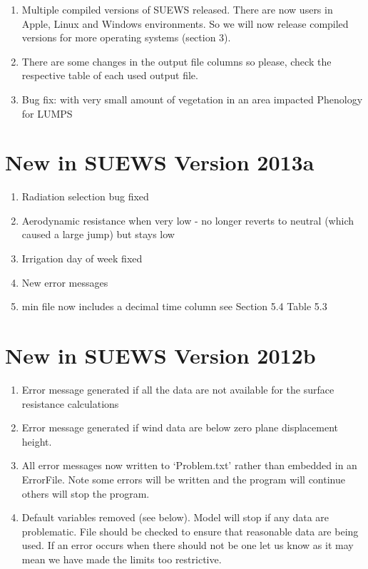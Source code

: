 \documentclass[letterpaper,10pt,english]{sphinxmanual}
\begin{document}
\begin{enumerate}
\item {} 
Multiple compiled versions of SUEWS released. There are now users in
Apple, Linux and Windows environments. So we will now release
compiled versions for more operating systems (section 3).

\item {} 
There are some changes in the output file columns so please, check
the respective table of each used output file.

\item {} 
Bug fix: with very small amount of vegetation in an area \textendash{} impacted
Phenology for LUMPS

\end{enumerate}


\section{New in SUEWS Version 2013a}
\label{\detokenize{version-history:new-in-suews-version-2013a}}\begin{enumerate}
\item {} 
Radiation selection bug fixed

\item {} 
Aerodynamic resistance \textendash{} when very low - no longer reverts to neutral
(which caused a large jump) \textendash{} but stays low

\item {} 
Irrigation day of week fixed

\item {} 
New error messages

\item {} 
min file \textendash{} now includes a decimal time column \textendash{} see Section 5.4 \textendash{}
Table 5.3

\end{enumerate}


\section{New in SUEWS Version 2012b}
\label{\detokenize{version-history:new-in-suews-version-2012b}}\begin{enumerate}
\item {} 
Error message generated if all the data are not available for the
surface resistance calculations

\item {} 
Error message generated if wind data are below zero plane
displacement height.

\item {} 
All error messages now written to ‘Problem.txt’ rather than embedded
in an ErrorFile. Note some errors will be written and the program
will continue others will stop the program.

\item {} 
Default variables removed (see below). Model will stop if any data
are problematic. File should be checked to ensure that reasonable
data are being used. If an error occurs when there should not be one
let us know as it may mean we have made the limits too restrictive.

\end{enumerate}
\end{document}
